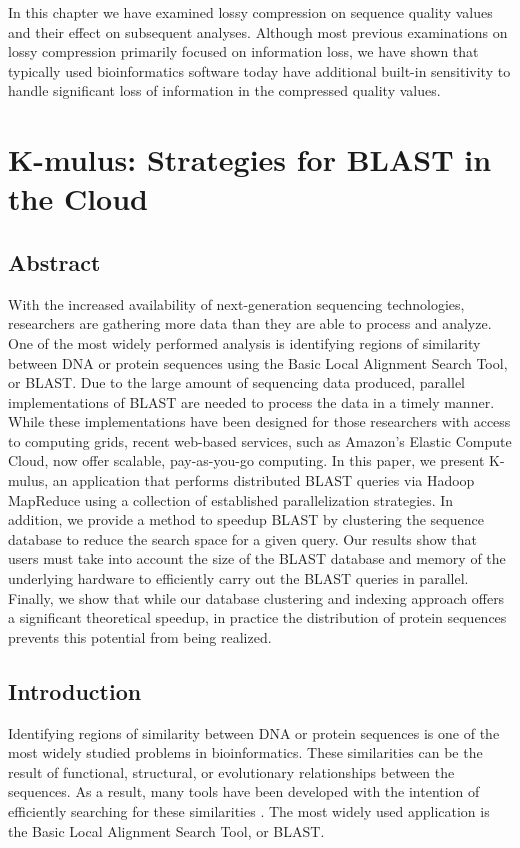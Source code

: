 \documentclass[12pt,\mydriver]{thesis}
\providecommand{\DIFaddbegin}{} %
\providecommand{\DIFaddend}{} %
\begin{document}
In this chapter we have examined lossy compression on sequence quality
values and their effect on subsequent analyses. Although most previous
examinations on lossy compression primarily focused on information
loss, we have shown that typically used bioinformatics software today
have additional built-in sensitivity to handle significant loss of
information in the compressed quality values.
\clearpage{}
\clearpage{}\section{K-mulus: Strategies for BLAST in the Cloud}
\DIFaddbegin \label{kmulus-section}
\DIFaddend \subsection{Abstract}
With the increased availability of next-generation sequencing technologies, researchers are gathering more data than they are able to process and analyze. One of the most widely performed analysis is identifying regions of similarity between DNA or protein sequences using the Basic Local Alignment Search Tool, or BLAST. Due to the large amount of sequencing data produced, parallel implementations of BLAST are needed to process the data in a timely manner.  While these implementations have been designed for those researchers with access to computing grids, recent web-based services, such as Amazon's Elastic Compute Cloud, now offer scalable, pay-as-you-go computing.  In this paper, we present K-mulus, an application that performs distributed BLAST queries via Hadoop MapReduce using a collection of established parallelization strategies. In addition, we provide a method to speedup BLAST by clustering the sequence database to reduce the search space for a given query.  Our results show that users must take into account the size of the BLAST database and memory of the underlying hardware to efficiently carry out the BLAST queries in parallel.  Finally, we show that while our database clustering and indexing approach offers a significant theoretical speedup, in practice the distribution of protein sequences prevents this potential from being realized.

\subsection{Introduction}
Identifying regions of similarity between DNA or protein sequences is one of the most widely studied problems in bioinformatics. These similarities can be the result of functional, structural, or evolutionary relationships between the sequences. As a result, many tools have been developed with the intention of efficiently searching for these similarities \cite{altschul1990basic,eddy2009new,kent2002blat}. The most widely used application is the Basic Local Alignment Search Tool, or BLAST\cite{altschul1990basic}.
\end{document}
